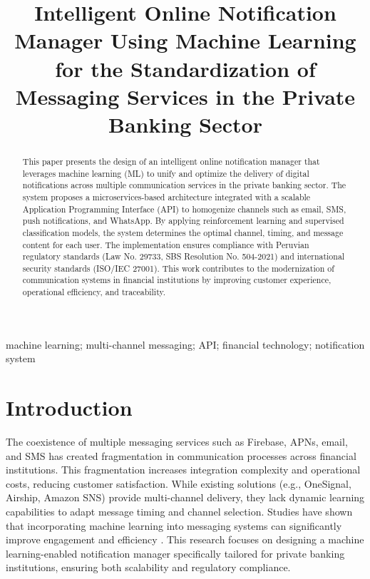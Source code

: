 \documentclass[conference]{IEEEtran}
\begin{document}
\title{Intelligent Online Notification Manager Using Machine Learning for the Standardization of Messaging Services in the Private Banking Sector}

\author{
}

\maketitle

\begin{abstract}
This paper presents the design of an intelligent online notification manager that leverages machine learning (ML) to unify and optimize the delivery of digital notifications across multiple communication services in the private banking sector. The system proposes a microservices-based architecture integrated with a scalable Application Programming Interface (API) to homogenize channels such as email, SMS, push notifications, and WhatsApp. By applying reinforcement learning and supervised classification models, the system determines the optimal channel, timing, and message content for each user. The implementation ensures compliance with Peruvian regulatory standards (Law No. 29733, SBS Resolution No. 504-2021) and international security standards (ISO/IEC 27001). This work contributes to the modernization of communication systems in financial institutions by improving customer experience, operational efficiency, and traceability.
\end{abstract}

\begin{IEEEkeywords}
machine learning; multi-channel messaging; API; financial technology; notification system
\end{IEEEkeywords}

\section{Introduction}

The coexistence of multiple messaging services such as Firebase, APNs, email, and SMS has created fragmentation in communication processes across financial institutions. This fragmentation increases integration complexity and operational costs, reducing customer satisfaction. While existing solutions (e.g., OneSignal, Airship, Amazon SNS) provide multi-channel delivery, they lack dynamic learning capabilities to adapt message timing and channel selection. Studies have shown that incorporating machine learning into messaging systems can significantly improve engagement and efficiency \cite{rahimi2021}. This research focuses on designing a machine learning-enabled notification manager specifically tailored for private banking institutions, ensuring both scalability and regulatory compliance.
\end{document}
